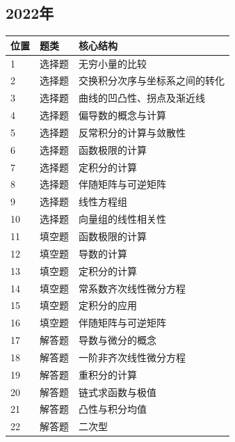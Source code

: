 \subsection*{2022年}
\begin{longtable}{p{9mm}p{25mm}p{109mm}}\toprule 位置&题类&核心结构\\\midrule\endhead
1&选择题&无穷小量的比较\\
2&选择题&交换积分次序与坐标系之间的转化\\
3&选择题&曲线的凹凸性、拐点及渐近线\\
4&选择题&偏导数的概念与计算\\
5&选择题&反常积分的计算与敛散性\\
6&选择题&函数极限的计算\\
7&选择题&定积分的计算\\
8&选择题&伴随矩阵与可逆矩阵\\
9&选择题&线性方程组\\
10&选择题&向量组的线性相关性\\
11&填空题&函数极限的计算\\
12&填空题&导数的计算\\
13&填空题&定积分的计算\\
14&填空题&常系数齐次线性微分方程\\
15&填空题&定积分的应用\\
16&填空题&伴随矩阵与可逆矩阵\\
17&解答题&导数与微分的概念\\
18&解答题&一阶非齐次线性微分方程\\
19&解答题&重积分的计算\\
20&解答题&链式求函数与极值\\
21&解答题&凸性与积分均值\\
22&解答题&二次型\\
\bottomrule\end{longtable}
